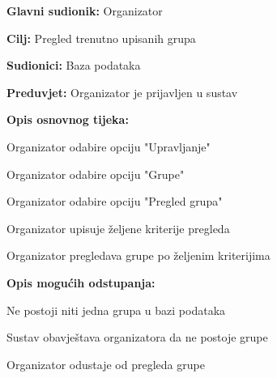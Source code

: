 					\noindent {}
					\begin{packed_item}
						
						\item \textbf{Glavni sudionik: }Organizator
						\item  \textbf{Cilj:} Pregled trenutno upisanih grupa
						\item  \textbf{Sudionici:} Baza podataka
						\item  \textbf{Preduvjet:} Organizator je prijavljen u sustav
						\item  \textbf{Opis osnovnog tijeka:}
						
						\item[] \begin{packed_enum}
							
							\item Organizator odabire opciju "Upravljanje"
							\item Organizator odabire opciju "Grupe"
							\item Organizator odabire opciju "Pregled grupa"
							\item Organizator upisuje željene kriterije pregleda
							\item Organizator pregledava grupe po željenim kriterijima
						\end{packed_enum}
						
						\item  \textbf{Opis mogućih odstupanja:}
						
						\item[] \begin{packed_item}
							
							\item[2.a] Ne postoji niti jedna grupa u bazi podataka
							\item[] \begin{packed_enum}
								
								\item Sustav obavještava organizatora da ne postoje grupe
								\item Organizator odustaje od pregleda grupe
								
							\end{packed_enum}						
						\end{packed_item}
					\end{packed_item}
				
